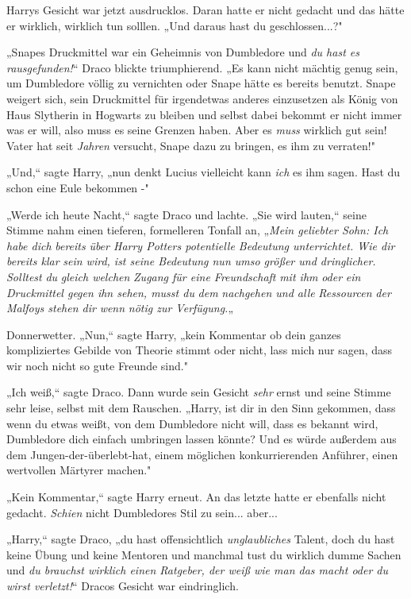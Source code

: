 {Harrys Gesicht war jetzt ausdrucklos. Daran hatte er nicht gedacht und das hätte er wirklich, wirklich tun solllen. „Und daraus hast du geschlossen...?"

„Snapes Druckmittel war ein Geheimnis von Dumbledore und \emph{du hast es rausgefunden!}“ Draco blickte triumphierend. „Es kann nicht mächtig genug sein, um Dumbledore völlig zu vernichten oder Snape hätte es bereits benutzt. Snape weigert sich, sein Druckmittel für irgendetwas anderes einzusetzen als König von Haus Slytherin in Hogwarts zu bleiben und selbst dabei bekommt er nicht immer was er will, also muss es seine Grenzen haben. Aber es \emph{muss} wirklich gut sein! Vater hat seit \emph{Jahren} versucht, Snape dazu zu bringen, es ihm zu verraten!"

„Und,“ sagte Harry, „nun denkt Lucius vielleicht kann \emph{ich} es ihm sagen. Hast du schon eine Eule bekommen -"

„Werde ich heute Nacht,“ sagte Draco und lachte. „Sie wird lauten,“ seine Stimme nahm einen tieferen, formelleren Tonfall an, „\emph{Mein geliebter Sohn: Ich habe dich} \emph{bereits} \emph{über Harry Potters potentielle Bedeutung unterrichtet. Wie dir bereits klar} \emph{sein wird, ist seine Bedeutung nun umso größer und dringlicher.} \emph{Solltest} \emph{du} \emph{gleich welchen} \emph{Zugang für eine Freundschaft} \emph{mit ihm} \emph{oder} \emph{ein} \emph{Druckmittel gegen ihn sehen, musst du} \emph{dem} \emph{nachgehen und alle} \emph{Ressourcen} \emph{der Malfoys stehen dir} \emph{wenn} \emph{nötig zur Verfügung.}„

Donnerwetter. „Nun,“ sagte Harry, „kein Kommentar ob dein ganzes kompliziertes Gebilde von Theorie stimmt oder nicht, lass mich nur sagen, dass wir noch nicht so gute Freunde sind."

„Ich weiß,“ sagte Draco. Dann wurde sein Gesicht \emph{sehr} ernst und seine Stimme sehr leise, selbst mit dem Rauschen. „Harry, ist dir in den Sinn gekommen, dass wenn du etwas weißt, von dem Dumbledore nicht will, dass es bekannt wird, Dumbledore dich einfach umbringen lassen könnte? Und es würde außerdem aus dem Jungen-der-überlebt-hat, einem möglichen konkurrierenden Anführer, einen wertvollen Märtyrer machen."

„Kein Kommentar,“ sagte Harry erneut. An das letzte hatte er ebenfalls nicht gedacht. \emph{Schien} nicht Dumbledores Stil zu sein... aber...

„Harry,“ sagte Draco, „du hast offensichtlich \emph{unglaubliches} Talent, doch du hast keine Übung und keine Mentoren und manchmal tust du wirklich dumme Sachen und \emph{du brauchst wirklich einen Ratgeber, der weiß wie man das macht oder du wirst verletzt!}“ Dracos Gesicht war eindringlich.

}
